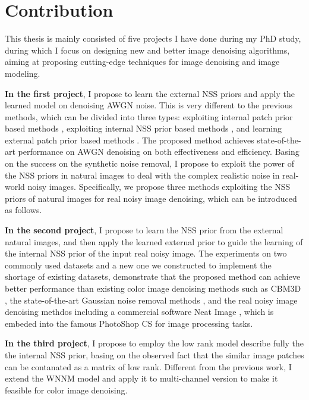 \section{Contribution}
\label{sec:intro:new}

This thesis is mainly consisted of five projects I have done during my PhD study, during which I focus on designing new and better image denoising algorithms, aiming at proposing cutting-edge techniques for image denoising and image modeling. 

\textbf{In the first project}, I propose to learn the external NSS priors and apply the learned model on denoising AWGN noise. This is very different to the previous methods, which can be divided into three types: exploiting internal patch prior based methods \cite{ksvd,ple}, exploiting internal NSS prior based methods \cite{bm3d,lssc,ncsr,wnnm}, and learning external patch prior based methods \cite{epll}. The proposed method achieves state-of-the-art performance on AWGN denoising on both effectiveness and efficiency. Basing on the success on the synthetic noise removal, I propose to exploit the power of the NSS priors in natural images to deal with the complex realistic noise in real-world noisy images. Specifically, we propose three methods exploiting the NSS priors of natural images for real noisy image denoising, which can be introduced as follows.

\textbf{In the second project}, I propose to learn the NSS prior from the external natural images, and then apply the learned external prior to guide the learning of the internal NSS prior of the input real noisy image. The experiments on two commonly used datasets and a new one we constructed to implement the shortage of existing datasets, demonstrate that the proposed method can achieve better performance than existing color image denoising methods such as CBM3D \cite{cbm3d}, the state-of-the-art Gaussian noise removal methods \cite{bm3d,mlp,csr}, and the real noisy image denoising methdos \cite{} including a commercial software Neat Image \cite{neatimage}, which is embeded into the famous PhotoShop CS for image processing tasks.


\textbf{In the third project}, I propose to employ the low rank model describe fully the the internal NSS prior, basing on the observed fact that the similar image patches can be contanated as a matrix of low rank. Different from the previous work, I extend the WNNM model and apply it to multi-channel version to make it feasible for color image denoising. 


